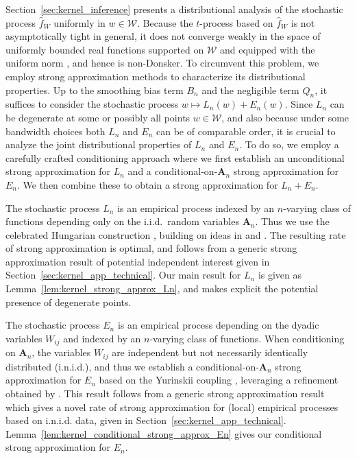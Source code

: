 \documentclass[11pt,lof]{puthesis}
\newcommand{\bA}{\ensuremath{\mathbf{A}}}
\newcommand{\cW}{\ensuremath{\mathcal{W}}}
\theoremstyle{break}
\theoremstyle{proof}
\begin{document}
Section~\ref{sec:kernel_inference} presents a distributional analysis of the
stochastic process $\hat{f}_W$ uniformly in $w \in \cW$. Because the
$t$-process based on $\hat{f}_W$ is
not asymptotically tight in general, it does not converge weakly in the space
of uniformly bounded real functions supported on $\cW$ and equipped with the
uniform norm \citep{van1996weak}, and hence is non-Donsker. To circumvent this
problem, we employ strong approximation methods to characterize its
distributional properties. Up to the smoothing bias term $B_n$ and the
negligible term $Q_n$, it suffices to consider the stochastic process
$w \mapsto L_n(w)+E_n(w)$. Since $L_n$ can be degenerate at some or possibly all
points $w\in\cW$, and also because under some bandwidth choices both $L_n$ and
$E_n$ can be of comparable order, it is crucial to analyze the joint
distributional properties of $L_n$ and $E_n$. To do so, we employ a carefully
crafted conditioning approach where we first establish an unconditional strong
approximation for $L_n$ and a conditional-on-$\bA_n$ strong approximation for
$E_n$. We then combine these to obtain a strong approximation for $L_n+E_n$.

The stochastic process $L_n$ is an empirical process indexed by an $n$-varying
class of functions depending only on the i.i.d.\ random variables $\bA_n$. Thus
we use the celebrated Hungarian construction \citep{komlos1975approximation},
building on ideas in \citet{gine2004kernel} and \citet{gine2010confidence}. The
resulting rate of strong approximation is optimal, and follows from a generic
strong approximation result of potential independent interest given in
Section~\ref{sec:kernel_app_technical}. Our main result for $L_n$ is given as
Lemma~\ref{lem:kernel_strong_approx_Ln}, and makes explicit the potential
presence of
degenerate points.

The stochastic process $E_n$ is an empirical process depending on the dyadic
variables $W_{i j}$ and indexed by an $n$-varying class of functions. When
conditioning on $\bA_n$, the variables $W_{i j}$ are independent but not
necessarily identically distributed (i.n.i.d.), and thus we establish a
conditional-on-$\bA_n$ strong approximation for $E_n$ based on the Yurinskii
coupling \citep{yurinskii1978error}, leveraging a refinement obtained by
\citet*[Lemma~38]{belloni2019conditional}. This result follows from a generic
strong approximation result which gives a novel rate of strong approximation
for (local) empirical processes based on i.n.i.d. data, given in
Section~\ref{sec:kernel_app_technical}.
Lemma~\ref{lem:kernel_conditional_strong_approx_En} gives our conditional strong
approximation for $E_n$.
\end{document}
